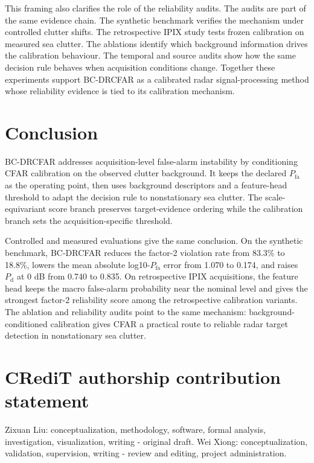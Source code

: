 \documentclass[preprint,12pt]{elsarticle}
\begin{document}
This framing also clarifies the role of the reliability audits. The audits are
part of the same evidence chain. The synthetic benchmark verifies the mechanism
under controlled clutter shifts. The retrospective IPIX study tests frozen
calibration on measured sea clutter. The ablations identify which background
information drives the calibration behaviour. The temporal and source audits
show how the same decision rule behaves when acquisition conditions change.
Together these experiments support BC-DRCFAR as a calibrated radar
signal-processing method whose reliability evidence is tied to its calibration
mechanism.

\section{Conclusion}
\label{sec:conclusion}

BC-DRCFAR addresses acquisition-level false-alarm instability by conditioning
CFAR calibration on the observed clutter background. It keeps the declared
$P_{\mathrm{fa}}$ as the operating point, then uses background descriptors and a
feature-head threshold to adapt the decision rule to nonstationary sea clutter.
The scale-equivariant score branch preserves target-evidence ordering while the
calibration branch sets the acquisition-specific threshold.

Controlled and measured evaluations give the same conclusion. On the synthetic
benchmark, BC-DRCFAR reduces the factor-2 violation rate from 83.3\% to 18.8\%,
lowers the mean absolute log10-$P_{\mathrm{fa}}$ error from 1.070 to 0.174, and
raises $P_{\mathrm{d}}$ at 0 dB from 0.740 to 0.835. On retrospective IPIX
acquisitions, the feature head keeps the macro false-alarm probability near the
nominal level and gives the strongest factor-2 reliability score among the
retrospective calibration variants. The ablation and reliability audits point to
the same mechanism:
background-conditioned calibration gives CFAR a practical route to reliable
radar target detection in nonstationary sea clutter.

\section*{CRediT authorship contribution statement}

Zixuan Liu: conceptualization, methodology, software, formal analysis,
investigation, visualization, writing - original draft. Wei Xiong:
conceptualization, validation, supervision, writing - review and editing,
project administration.
\end{document}
